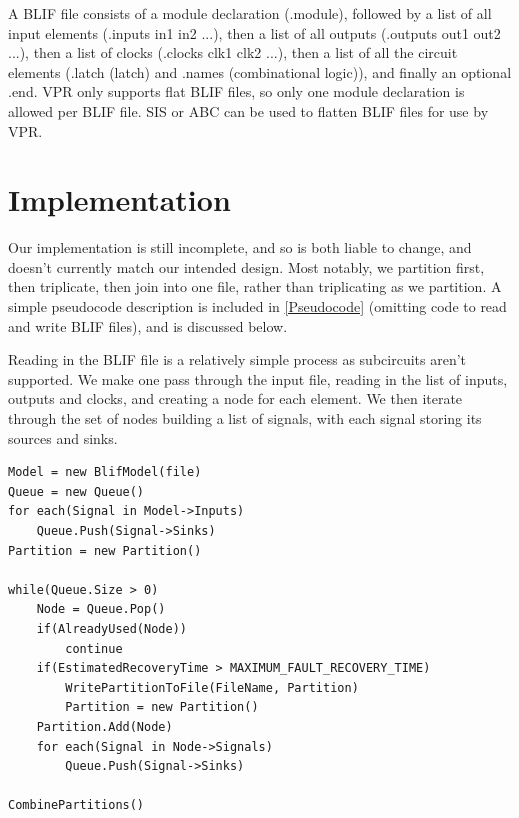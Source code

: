 \documentclass[12pt,drafta4paper,oneside]{memoir} %
\begin{document}
{A \ac{BLIF} file consists of a module declaration (.module), followed by a list of all input elements (.inputs in1 in2 ...), then a list of all outputs (.outputs out1 out2 ...), then a list of clocks (.clocks clk1 clk2 ...), then a list of all the circuit elements (.latch (latch) and .names (combinational logic)), and finally an optional .end.
\ac{VPR} only supports flat \ac{BLIF} files, so only one module declaration is allowed per \ac{BLIF} file. \ac{SIS} or \ac{ABC}  can be used to flatten \ac{BLIF} files for use by \ac{VPR}.

\section{Implementation}
Our implementation is still incomplete, and so is both liable to change, and doesn't currently match our intended design. Most notably, we partition first, then triplicate, then join into one file, rather than triplicating as we partition. A simple pseudocode description is included in \ref{Pseudocode} (omitting code to read and write \ac{BLIF} files), and is discussed below.

Reading in the \ac{BLIF} file is a relatively simple process as subcircuits aren't supported. We make one pass through the input file, reading in the list of inputs, outputs and clocks, and creating a node for each element. We then iterate through the set of nodes building a list of signals, with each signal storing its sources and sinks.

\begin{lstlisting}[caption=Simplified Pseudocode,label=Pseudocode]
Model = new BlifModel(file)
Queue = new Queue()
for each(Signal in Model->Inputs)
    Queue.Push(Signal->Sinks)
Partition = new Partition()

while(Queue.Size > 0)
    Node = Queue.Pop()
    if(AlreadyUsed(Node))
        continue
    if(EstimatedRecoveryTime > MAXIMUM_FAULT_RECOVERY_TIME)
        WritePartitionToFile(FileName, Partition)
        Partition = new Partition()
    Partition.Add(Node)
    for each(Signal in Node->Signals)
        Queue.Push(Signal->Sinks)
        
CombinePartitions()
\end{lstlisting}

}
\end{document}
